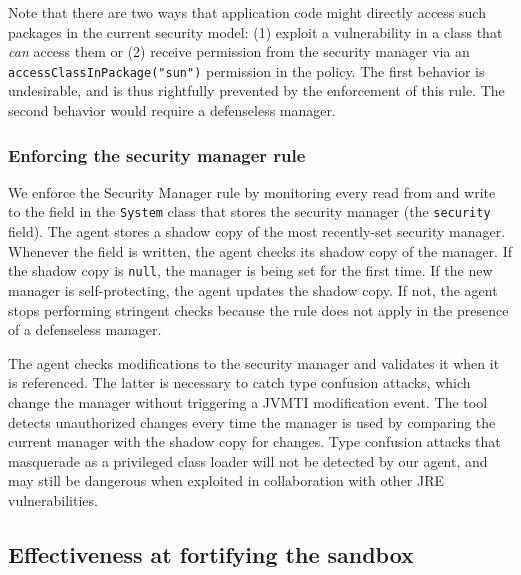 \documentclass{sig-alternate}
\begin{document}
Note that there are two ways that application code might directly access such
packages in the current security model: 
(1) exploit a vulnerability in a class that \emph{can} access them or (2)
receive permission from the security manager via an
\texttt{accessClassInPackage("sun")} permission in the policy.  The first behavior
is undesirable, and is thus rightfully prevented by the enforcement of this
rule.  The second behavior would require a defenseless manager. 


\subsubsection{Enforcing the security manager rule}\label{sub:Enforcing-the-SecurityManager}

We enforce the Security Manager rule by monitoring every read from
and write to the field in the \texttt{System} class that stores the security
manager (the \texttt{security} field).
%
The agent stores a shadow copy of the most recently-set security
manager.
Whenever the field is written, the agent checks its
shadow copy of the manager.  If the shadow copy is \texttt{null},
the manager is being set for the first time.  If the 
new manager is self-protecting,
the agent updates the shadow copy. If not, the agent stops performing stringent
checks because the rule does not apply in the presence of a defenseless 
manager.

The agent checks modifications to the security manager and validates it
when it is referenced.  The latter is necessary to
catch type confusion attacks, which 
change the manager without triggering a JVMTI modification event. 
The tool detects unauthorized changes every time the manager is 
used by comparing the current manager with the shadow copy for changes.
Type confusion attacks that masquerade as a privileged class loader 
will not be detected by our agent, and may still be dangerous when 
exploited in collaboration with other JRE vulnerabilities.

\subsection{Effectiveness at fortifying the sandbox}
\label{sub:Effectiveness-at-Fortifying}

\end{document}
